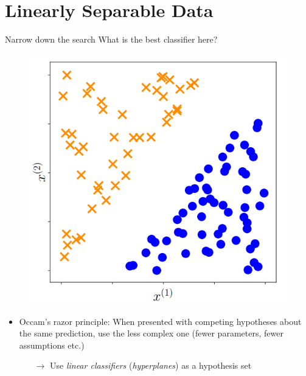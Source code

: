 \documentclass[dvipsnames]{beamer}
\begin{document}
		\section{Linearly Separable Data}
		\begin{frame}{Narrow down the search}
			What is the best classifier here?
				\begin{figure}
					\center
					\includegraphics[scale=.3]{figures/binary.png}
        \end{figure}
				\pause
			\begin{itemize}	
				\item Occam's razor principle: When presented with competing hypotheses about the same prediction, use the less complex one (fewer parameters, fewer assumptions etc.)
				\begin{itemize}
					\item[$\rightarrow$] Use \emph{linear classifiers} (\emph{hyperplanes}) as a hypothesis set 
				\end{itemize}
			\end{itemize}
    \end{frame}
		
\end{document}
